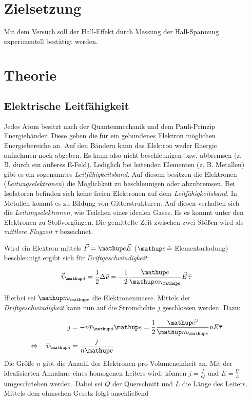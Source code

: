 \setcounter{page}{1}
\section*{Zielsetzung}
Mit dem Versuch soll der Hall-Effekt durch Messung der
Hall-Spannung experimentell bestätigt werden. %

\section{Theorie}

\subsection{Elektrische Leitfähigkeit}
Jedes Atom besitzt nach der Quantenmechanik und dem Pauli-Prinzip
Energiebänder.
Diese geben die für ein gebundenes Elektron möglichen Energiebereiche an. Auf den Bändern kann das Elektron weder
Energie aufnehmen noch abgeben. Es kann also
nicht beschleunigen bzw. abbremsen (z. B. durch ein äußeres E-Feld).
Lediglich bei leitenden Elementen (z. B. Metallen) gibt es ein sogenanntes \emph{Leitfähigkeitsband}.
Auf diesem besitzen die Elektronen (\emph{Leitungselektronen}) die Möglichkeit zu beschleunigen oder abzubremsen.
Bei Isolatoren befinden sich keine freien Elektronen auf dem \emph{Leitfähigkeitsband}.
In Metallen kommt es zu Bildung von Gitterstrukturen.
Auf diesen verhalten sich die \emph{Leitungselektronen}, wie Teilchen eines idealen Gases.
Es es kommt unter den Elektronen zu Stoßvorgängen.
Die gemittelte Zeit zwischen zwei Stößen wird als \emph{mittlere Flugzeit} $\overline{\tau}$ bezeichnet.

Wird ein Elektron mittels $\vec{F}=\map{e}\vec{E}$ ($\map{e}\, \hat{=}$ Elementarladung) beschleunigt %
ergibt sich für \emph{Driftgeschwindigkeit}: %

\begin{equation}
\label{eq:drift_v}
\vec{\overline{v}}\ua{d}=\frac{1}{2}\Delta\vec{v}=-\frac{1}{2}\frac{\map{e}}{\map{m}\ua{e}}\vec{E}\,\overline{\tau}
\end{equation}

Hierbei sei $\map{m}\ua{e}$ die Elektronenmasse.
Mittels der \emph{Driftgeschwindigkeit} kann nun auf die Stromdichte $j$ geschlossen werden. Dazu:

\begin{align}
j&=-n\overline{v}\ua{d}\map{e}=\frac{1}{2}\frac{\map{e^2}}{\map{m}\ua{e}}n E\overline{\tau}\notag \\
\Leftrightarrow \quad \overline{v}\ua{d}&=\frac{j}{n\map{e}}\label{eq:stromdicht}
\end{align}
Die Größe $n$ gibt die Anzahl der Elektronen pro Volumeneinheit an.
Mit der idealisierten Annahme eines homogenen Leiters wird, können %
$j=\frac{I}{Q}$ und $E=\frac{U}{L}$ umgeschrieben werden.
Dabei sei $Q$ der Querschnitt und $L$ die Länge des Leiters.
Mittels dem ohmschen Gesetz folgt anschließend

